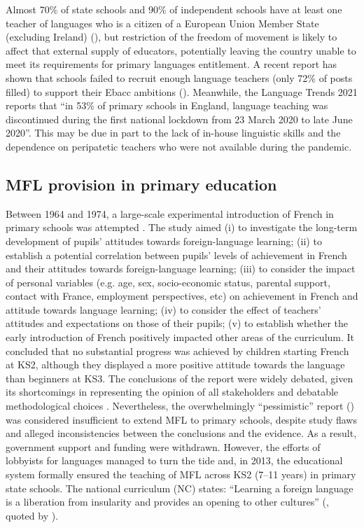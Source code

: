 \documentclass[output=paper]{langscibook}
\begin{document}
Almost 70\% of state schools and 90\% of independent schools have at least one teacher of languages who is a citizen of a European Union Member State (excluding Ireland) (\citealt{Collen2020}), but restriction of the freedom of movement is likely to affect that external supply of educators, potentially leaving the country unable to meet its requirements for primary languages entitlement. A recent report has shown that schools failed to recruit enough language teachers (only 72\% of posts filled) to support their Ebacc ambitions (\citealt{LongDanechi2021}). Meanwhile, the Language Trends 2021 \citep[4]{Collen2021} reports that “in 53\% of primary schools in England, language teaching was discontinued during the first national lockdown from 23  {March 2020} to late  {June 2020}”. This may be due in part to the lack of in-house linguistic skills and the dependence on peripatetic teachers who were not available during the pandemic.

\subsection{MFL provision in primary education}

Between 1964 and 1974, a large-scale experimental introduction of French in primary schools was attempted \citep{Burstall1974}. The study aimed (i) to investigate the long-term development of pupils’ attitudes towards foreign-language learning; (ii) to establish a potential correlation between pupils’ levels of achievement in French and their attitudes towards foreign-language learning; (iii) to consider the impact of personal variables (e.g. age, sex, socio-economic status, parental support, contact with France, employment perspectives, etc) on achievement in French and attitude towards language learning; (iv) to consider the effect of teachers’ attitudes and expectations on those of their pupils; (v) to establish whether the early introduction of French positively impacted other areas of the curriculum. It concluded that no substantial progress was achieved by children starting French at KS2, although they displayed a more positive attitude towards the language than beginners at KS3. The conclusions of the report were widely debated, given its shortcomings in representing the opinion of all stakeholders and debatable methodological choices \citep{Buckby1976}. Nevertheless, the overwhelmingly ``pessimistic'' report (\citealt{HuntEtAl2005}) was considered insufficient to extend MFL to primary schools, despite study flaws and alleged inconsistencies between the conclusions and the evidence. As a result, government support and funding were withdrawn. However, the efforts of lobbyists for languages managed to turn the tide and, in 2013, the educational system formally ensured the teaching of MFL across KS2 (7--11 years) in primary state schools. The national curriculum (NC) states: ``Learning a foreign language is a liberation from insularity and provides an opening to other cultures'' (\citealt{DfE2013key}, quoted by \citealt[7]{Zefi2021}).
\end{document}
